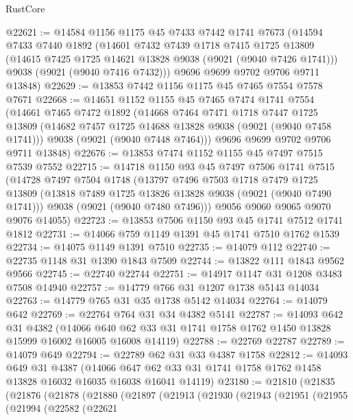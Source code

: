 \begin{lexlean}{RustCore}
\begin{coremodule}
@22621 := @14584
    @1156
    @1175
    @45
    @7433
    @7442
    @1741
    @7673
    (@14594
      @7433
      @7440
      @1892
      (@14601
        @7432
        @7439
        @1718
        @7415
        @1725
        @13809
        (@14615 @7425 @1725 @14621 @13828 @9038 (@9021 (@9040 @7426 @1741)))
        @9038
        (@9021 (@9040 @7416 @7432)))
      @9696
      @9699
      @9702
      @9706
      @9711
      @13848)
@22629 := @13853 @7442 @1156 @1175 @45 @7465 @7554 @7578 @7671
@22668 := @14651
    @1152
    @1155
    @45
    @7465
    @7474
    @1741
    @7554
    (@14661
      @7465
      @7472
      @1892
      (@14668
        @7464
        @7471
        @1718
        @7447
        @1725
        @13809
        (@14682 @7457 @1725 @14688 @13828 @9038 (@9021 (@9040 @7458 @1741)))
        @9038
        (@9021 (@9040 @7448 @7464)))
      @9696
      @9699
      @9702
      @9706
      @9711
      @13848)
@22676 := @13853 @7474 @1152 @1155 @45 @7497 @7515 @7539 @7552
@22715 := @14718
    @1150
    @93
    @45
    @7497
    @7506
    @1741
    @7515
    (@14728
      @7497
      @7504
      @1748
      (@13797
        @7496
        @7503
        @1718
        @7479
        @1725
        @13809
        (@13818 @7489 @1725 @13826 @13828 @9038 (@9021 (@9040 @7490 @1741)))
        @9038
        (@9021 (@9040 @7480 @7496)))
      @9056
      @9060
      @9065
      @9070
      @9076
      @14055)
@22723 := @13853 @7506 @1150 @93 @45 @1741 @7512 @1741 @1812
@22731 := @14066 @759 @1149 @1391 @45 @1741 @7510 @1762 @1539
@22734 := @14075 @1149 @1391 @7510
@22735 := @14079 @112
@22740 := @22735 @1148 @31 @1390 @1843 @7509
@22744 := @13822 @111 @1843 @9562 @9566
@22745 := @22740 @22744
@22751 := @14917 @1147 @31 @1208 @3483 @7508 @14940
@22757 := @14779 @766 @31 @1207 @1738 @5143 @14034
@22763 := @14779 @765 @31 @35 @1738 @5142 @14034
@22764 := @14079 @642
@22769 := @22764 @764 @31 @34 @4382 @5141
@22787 := @14093
    @642
    @31
    @4382
    (@14066 @640 @62 @33 @31 @1741 @1758 @1762 @1450 @13828 @15999 @16002 @16005 @16008 @14119)
@22788 := @22769 @22787
@22789 := @14079 @649
@22794 := @22789 @62 @31 @33 @4387 @1758
@22812 := @14093
    @649
    @31
    @4387
    (@14066 @647 @62 @33 @31 @1741 @1758 @1762 @1458 @13828 @16032 @16035 @16038 @16041 @14119)
@23180 := @21810
    (@21835
      (@21876
        (@21878
          (@21880
            (@21897
              (@21913
                (@21930
                  (@21943
                    (@21951
                      (@21955
                        (@21994
                          (@22582
                            (@22621

\end{coremodule}
\end{lexlean}
